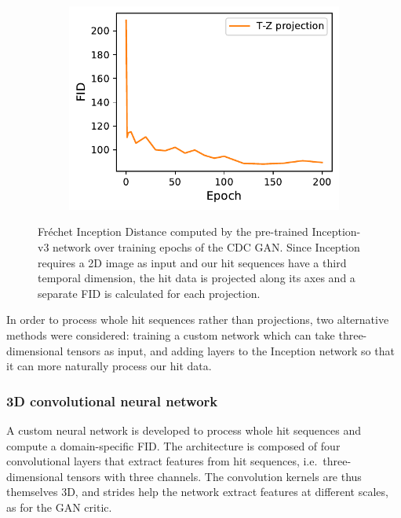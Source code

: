 \begin{figure}
\begin{subfigure}[t]{0.32\textwidth}
        \centering
        \hspace{-0.85cm}
        \includegraphics[width=\textwidth]{chapter4/fid_epoch-tz.pdf}
    \end{subfigure}
    \caption{ Fréchet Inception Distance computed by the pre-trained
        Inception-v3 network over training epochs of the CDC GAN. Since
        Inception requires a 2D image as input and our hit sequences have a
        third temporal dimension, the hit data is projected along its axes and
        a separate FID is calculated for each projection. }
    \label{fig:FID_vs_epochs}
\end{figure}


In order to process whole hit sequences rather than projections, two alternative
methods were considered: training a custom network which can take
three-dimensional tensors as input, and adding layers to the Inception network
so that it can more naturally process our hit data.

\subsubsection{3D convolutional neural network}

A custom neural network is developed to process whole hit sequences and compute a
domain-specific FID. The architecture is composed of four convolutional layers that
extract features from hit sequences, i.e.\ three-dimensional tensors with three
channels. The convolution kernels are thus themselves 3D, and strides help the
network extract features at different scales, as for the GAN critic.


